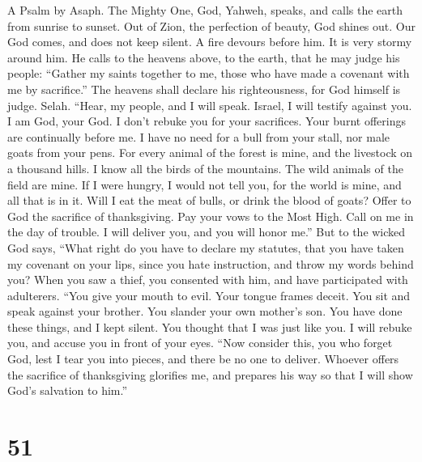 A Psalm by Asaph.  The Mighty One, God, Yahweh, speaks, and
calls the earth from sunrise to sunset.  Out of Zion, the
perfection of beauty, God shines out.  Our God comes, and
does not keep silent. A fire devours before him. It is very stormy
around him.  He calls to the heavens above, to the earth,
that he may judge his people:  ``Gather my saints together
to me, those who have made a covenant with me by sacrifice.''
 The heavens shall declare his righteousness, for God
himself is judge. Selah.  ``Hear, my people, and I will
speak. Israel, I will testify against you. I am God, your God.
 I don't rebuke you for your sacrifices. Your burnt
offerings are continually before me.  I have no need for a
bull from your stall, nor male goats from your pens.  For
every animal of the forest is mine, and the livestock on a thousand
hills.  I know all the birds of the mountains. The wild
animals of the field are mine.  If I were hungry, I would
not tell you, for the world is mine, and all that is in it.
 Will I eat the meat of bulls, or drink the blood of goats?
 Offer to God the sacrifice of thanksgiving. Pay your vows
to the Most High.  Call on me in the day of trouble. I will
deliver you, and you will honor me.''  But to the wicked
God says, ``What right do you have to declare my statutes, that you have
taken my covenant on your lips,  since you hate
instruction, and throw my words behind you?  When you saw a
thief, you consented with him, and have participated with adulterers.
 ``You give your mouth to evil. Your tongue frames deceit.
 You sit and speak against your brother. You slander your
own mother's son.  You have done these things, and I kept
silent. You thought that I was just like you. I will rebuke you, and
accuse you in front of your eyes.  ``Now consider this, you
who forget God, lest I tear you into pieces, and there be no one to
deliver.  Whoever offers the sacrifice of thanksgiving
glorifies me, and prepares his way so that I will show God's salvation
to him.''

\hypertarget{section-49}{%
\section{51}\label{section-49}}

